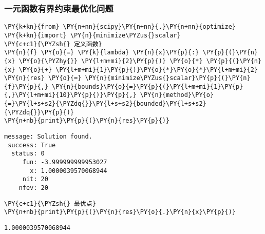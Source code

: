     \hypertarget{ux4e00ux5143ux51fdux6570ux6709ux754cux7ea6ux675fux6700ux4f18ux5316ux95eeux9898}{%
\subsubsection{一元函数有界约束最优化问题}\label{ux4e00ux5143ux51fdux6570ux6709ux754cux7ea6ux675fux6700ux4f18ux5316ux95eeux9898}}

    \begin{tcolorbox}[breakable, size=fbox, boxrule=1pt, pad at break*=1mm,colback=cellbackground, colframe=cellborder]
\begin{Verbatim}[commandchars=\\\{\}]
\PY{k+kn}{from} \PY{n+nn}{scipy}\PY{n+nn}{.}\PY{n+nn}{optimize} \PY{k+kn}{import} \PY{n}{minimize\PYZus{}scalar}
\PY{c+c1}{\PYZsh{} 定义函数}
\PY{n}{f} \PY{o}{=} \PY{k}{lambda} \PY{n}{x}\PY{p}{:} \PY{p}{(}\PY{n}{x} \PY{o}{\PYZhy{}} \PY{l+m+mi}{2}\PY{p}{)} \PY{o}{*} \PY{p}{(}\PY{n}{x} \PY{o}{+} \PY{l+m+mi}{1}\PY{p}{)}\PY{o}{*}\PY{o}{*}\PY{l+m+mi}{2}
\PY{n}{res} \PY{o}{=} \PY{n}{minimize\PYZus{}scalar}\PY{p}{(}\PY{n}{f}\PY{p}{,} \PY{n}{bounds}\PY{o}{=}\PY{p}{(}\PY{l+m+mi}{1}\PY{p}{,}\PY{l+m+mi}{10}\PY{p}{)}\PY{p}{,} \PY{n}{method}\PY{o}{=}\PY{l+s+s2}{\PYZdq{}}\PY{l+s+s2}{bounded}\PY{l+s+s2}{\PYZdq{}}\PY{p}{)}
\PY{n+nb}{print}\PY{p}{(}\PY{n}{res}\PY{p}{)}
\end{Verbatim}
\end{tcolorbox}

    \begin{Verbatim}[commandchars=\\\{\}]
 message: Solution found.
 success: True
  status: 0
     fun: -3.999999999953027
       x: 1.0000039570068944
     nit: 20
    nfev: 20
    \end{Verbatim}

    \begin{tcolorbox}[breakable, size=fbox, boxrule=1pt, pad at break*=1mm,colback=cellbackground, colframe=cellborder]
\begin{Verbatim}[commandchars=\\\{\}]
\PY{c+c1}{\PYZsh{} 最优点}
\PY{n+nb}{print}\PY{p}{(}\PY{n}{res}\PY{o}{.}\PY{n}{x}\PY{p}{)}
\end{Verbatim}
\end{tcolorbox}

    \begin{Verbatim}[commandchars=\\\{\}]
1.0000039570068944
    \end{Verbatim}
